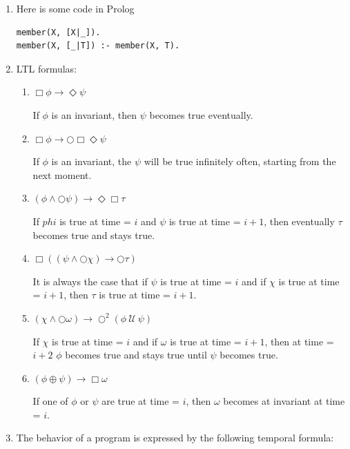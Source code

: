 \documentclass[12pt]{article}
\begin{document}
\begin{enumerate}
\item Here is some code in Prolog
\begin{verbatim}
member(X, [X|_]).
member(X, [_|T]) :- member(X, T).
\end{verbatim}


\item LTL formulas:

\begin{enumerate}
	
	\item $\Box \phi \rightarrow \Diamond \psi $
	
	\noindent If $\phi$ is an invariant, then $\psi$ becomes true eventually.
	
	\item $\Box \phi \rightarrow \bigcirc \Box \Diamond \psi$
	
	\noindent If $\phi$ is an invariant, the $\psi$ will be true infinitely often, starting 	
	from the next moment.
	
	\item $(\phi \wedge \bigcirc \psi) \rightarrow \Diamond \Box \tau$	
	
	\noindent If $phi$ is true at time = $i$ and $\psi$ is true at time = $i + 1$,
	then eventually $\tau$ becomes true and stays true.
	
	\item $\Box (( \psi \wedge \bigcirc \chi) \rightarrow \bigcirc \tau)$
	
	\noindent It is always the case that if $\psi$ is true at time = $i$ and if $\chi$ is 	 
	true at time = $i + 1$, then $\tau$ is true at time = $i + 1.$
	
	\item $ (\chi \wedge \bigcirc \omega) \rightarrow \bigcirc^{2} ( \phi ~\mathcal{U}~ \psi )$
	
	\noindent If $\chi$ is true at time = $i$ and if $\omega$ is true at time = $i + 1$,
	then at time  = $i + 2$ $\phi$ becomes true and stays true until $\psi$ becomes 
	true.
	
	\item $( \phi \oplus \psi ) \rightarrow \Box \omega $
	
	\noindent If one of $\phi$ or $\psi$ are true at time = $i$, then $\omega$ becomes at
	invariant at time = $i.$	
	
	
\end{enumerate}


\item The behavior of a program is expressed by the following temporal formula:


\end{enumerate}
\end{document}

